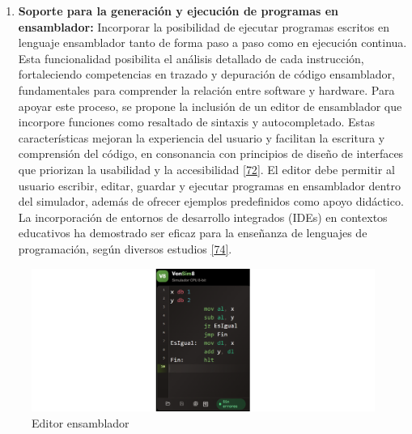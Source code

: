 \documentclass[12pt,oneside]{templates/unerthesis}
\providecommand{\tightlist}{%
  \setlength{\itemsep}{0pt}\setlength{\parskip}{0pt}}
\begin{document}
\begin{enumerate}
\def\labelenumi{\arabic{enumi}.}
\setcounter{enumi}{1}
\tightlist
\item
  \textbf{Soporte para la generación y ejecución de programas en ensamblador:}
  Incorporar la posibilidad de ejecutar programas escritos en lenguaje ensamblador tanto de forma paso a paso como en ejecución continua. Esta funcionalidad posibilita el análisis detallado de cada instrucción, fortaleciendo competencias en trazado y depuración de código ensamblador, fundamentales para comprender la relación entre software y hardware.
  Para apoyar este proceso, se propone la inclusión de un editor de ensamblador que incorpore funciones como resaltado de sintaxis y autocompletado. Estas características mejoran la experiencia del usuario y facilitan la escritura y comprensión del código, en consonancia con principios de diseño de interfaces que priorizan la usabilidad y la accesibilidad \protect\hyperlink{ref-w3c_accessibility_2021}{{[}72{]}}. El editor debe permitir al usuario escribir, editar, guardar y ejecutar programas en ensamblador dentro del simulador, además de ofrecer ejemplos predefinidos como apoyo didáctico. La incorporación de entornos de desarrollo integrados (IDEs) en contextos educativos ha demostrado ser eficaz para la enseñanza de lenguajes de programación, según diversos estudios \protect\hyperlink{ref-mccracken2001does}{{[}74{]}}.
\end{enumerate}

\begin{figure}

{\centering \includegraphics[width=1\linewidth]{images/editor} 

}

\caption{Editor ensamblador}\label{fig:editor}
\end{figure}
\end{document}
